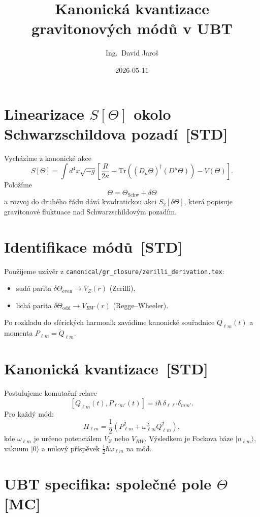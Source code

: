 \documentclass[12pt,a4paper]{article}
\title{\textbf{Kanonická kvantizace gravitonových módů v UBT}}
\author{Ing.\ David Jaro\v{s}}
\date{2026-05-11}
\begin{document}
\maketitle

\section{Linearizace $S[\Theta]$ okolo Schwarzschildova pozadí \,[STD]}

Vycházíme z kanonické akce
\[
S[\Theta]=\int d^4x\sqrt{-g}\left[\frac{R}{2\kappa}+\mathrm{Tr}\!\left((D_\mu\Theta)^\dagger(D^\mu\Theta)\right)-V(\Theta)\right].
\]
Položíme
\[
\Theta=\Theta_{\mathrm{Schw}}+\delta\Theta
\]
a rozvoj do druhého řádu dává kvadratickou akci $S_2[\delta\Theta]$, která
popisuje gravitonové fluktuace nad Schwarzschildovým pozadím.

\section{Identifikace módů \,[STD]}

Použijeme uzávěr z
\texttt{canonical/gr\_closure/zerilli\_derivation.tex}:
\begin{itemize}
  \item sudá parita $\delta\Theta_{\mathrm{even}} \to V_Z(r)$ (Zerilli),
  \item lichá parita $\delta\Theta_{\mathrm{odd}} \to V_{RW}(r)$ (Regge--Wheeler).
\end{itemize}
Po rozkladu do sférických harmonik zavádíme kanonické souřadnice
$Q_{\ell m}(t)$ a momenta $P_{\ell m}=\dot Q_{\ell m}$.

\section{Kanonická kvantizace \,[STD]}

Postulujeme komutační relace
\[
[Q_{\ell m}(t),P_{\ell' m'}(t)]=i\hbar\,\delta_{\ell\ell'}\delta_{mm'}.
\]
Pro každý mód:
\[
H_{\ell m}=\frac12\!\left(P_{\ell m}^2+\omega_{\ell m}^2Q_{\ell m}^2\right),
\]
kde $\omega_{\ell m}$ je určeno potenciálem $V_Z$ nebo $V_{RW}$.
Výsledkem je Fockova báze $|n_{\ell m}\rangle$, vakuum $|0\rangle$ a nulový
příspěvek $\frac12\hbar\omega_{\ell m}$ na mód.

\section{UBT specifika: společné pole $\Theta$ \,[MC]}
\end{document}
